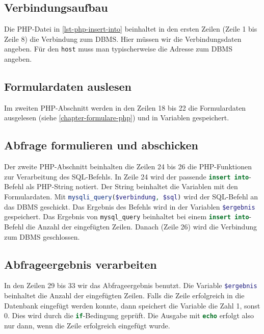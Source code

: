 \subsection{Verbindungsaufbau}

Die \ac{PHP}-Datei in \autoref{lst-php-insert-into} beinhaltet in den ersten Zeilen (Zeile \num{1} bis Zeile \num{8}) die Verbindung zum \ac{DBMS}. Hier müssen wir die Verbindungsdaten angeben. Für den \lstinline{host} muss man typischerweise die Adresse zum \ac{DBMS} angeben.

\subsection{Formulardaten auslesen}

Im zweiten \ac{PHP}-Abschnitt werden in den Zeilen \num{18} bis \num{22} die Formulardaten ausgelesen (siehe \autoref{chapter-formulare-php}) und in Variablen gespeichert.

\subsection{Abfrage formulieren und abschicken}

Der zweite \ac{PHP}-Abschnitt beinhalten die Zeilen \num{24} bis \num{26} die \ac{PHP}-Funktionen zur Verarbeitung des \ac{SQL}-Befehls. In Zeile \num{24} wird der passende \lstinline[language=SQL]{insert into}-Befehl als \ac{PHP}-String notiert. Der String beinhaltet die Variablen mit den Formulardaten. Mit  \lstinline[language=PHP]{mysqli_query($verbindung, $sql)} wird der \ac{SQL}-Befehl an das \ac{DBMS} geschickt. Das Ergebnis des Befehls wird in der Variablen \lstinline[language=PHP]{$ergebnis} gespeichert. Das Ergebnis von \lstinline{mysql_query} beinhaltet bei einem  \lstinline[language=SQL]{insert into}-Befehl  die Anzahl der eingefügten Zeilen. Danach (Zeile 26) wird die Verbindung zum \ac{DBMS} geschlossen.

\subsection{Abfrageergebnis verarbeiten}

In den Zeilen \num{29} bis \num{33} wir das Abfrageergebnis benutzt. Die Variable \lstinline[language=PHP]{$ergebnis} beinhaltet die Anzahl der eingefügten Zeilen. Falls die Zeile erfolgreich in die Datenbank eingefügt werden konnte, dann speichert die Variable die Zahl \num{1}, sonst \num{0}. Dies wird durch die \lstinline[language=PHP]{if}-Bedingung geprüft. Die Ausgabe mit \lstinline[language=PHP]{echo} erfolgt also nur dann, wenn die Zeile erfolgreich eingefügt wurde.

